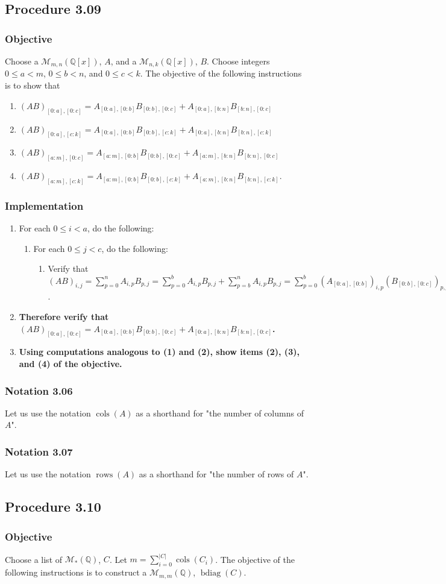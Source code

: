 \documentclass[twocolumn]{article}
\DeclareMathOperator{\bdiag}{bdiag}
\DeclareMathOperator{\cols}{cols}
\DeclareMathOperator{\rows}{rows}
\newcommand{\notation}[1]{\subsubsection*{Notation #1}}
\newcommand{\procedure}[2][]{\subsection*{Procedure #2 \ifthenelse{\equal{#1}{}}{}{(#1)}}\label{sec:procedure #2}}
\newcommand{\objective}{\subsubsection*{Objective}}
\newcommand{\implementation}{\subsubsection*{Implementation}}
\begin{document}
		\procedure{3.09}
			\objective
				Choose a $\mathcal{M}_{m,n}(\mathbb{Q}[x])$, $A$, and a $\mathcal{M}_{n,k}(\mathbb{Q}[x])$, $B$. Choose integers $0\le a<m$, $0\le b<n$, and $0\le c<k$. The objective of the following instructions is to show that
				\begin{enumerate}
					\item $(AB)_{[0:a],[0:c]}=A_{[0:a],[0:b]}B_{[0:b],[0:c]}+A_{[0:a],[b:n]}B_{[b:n],[0:c]}$
					\item $(AB)_{[0:a],[c:k]}=A_{[0:a],[0:b]}B_{[0:b],[c:k]}+A_{[0:a],[b:n]}B_{[b:n],[c:k]}$
					\item $(AB)_{[a:m],[0:c]}=A_{[a:m],[0:b]}B_{[0:b],[0:c]}+A_{[a:m],[b:n]}B_{[b:n],[0:c]}$
					\item $(AB)_{[a:m],[c:k]}=A_{[a:m],[0:b]}B_{[0:b],[c:k]}+A_{[a:m],[b:n]}B_{[b:n],[c:k]}$.
				\end{enumerate}
			\implementation
				\begin{enumerate}
					\item For each $0\le i<a$, do the following:
					\begin{enumerate}
						\item For each $0\le j<c$, do the following:
							\begin{enumerate}
								\item Verify that $(AB)_{i,j}=\sum_{p=0}^n A_{i,p}B_{p,j}=\sum_{p=0}^{b} A_{i,p}B_{p,j}+\sum_{p=b}^n A_{i,p}B_{p,j}=\sum_{p=0}^{b} (A_{[0:a],[0:b]})_{i,p}(B_{[0:b],[0:c]})_{p,j}+\sum_{p=0}^{n-b} (A_{[0:a],[b:n]})_{i,p}(B_{[b:n],[0:c]})_{p,j}=(A_{[0:a],[0:b]}B_{[0:b],[0:c]})_{i,j}+(A_{[0:a],[b:n]}B_{[b:n],[0:c]})_{i,j}$.
							\end{enumerate}
					\end{enumerate}
					\item \textbf{Therefore verify that $(AB)_{[0:a],[0:c]}=A_{[0:a],[0:b]}B_{[0:b],[0:c]}+A_{[0:a],[b:n]}B_{[b:n],[0:c]}$.}
					\item \textbf{Using computations analogous to (1) and (2), show items (2), (3), and (4) of the objective.}
				\end{enumerate}
		\notation{3.06}
			Let us use the notation $\cols(A)$ as a shorthand for "the number of columns of $A$".
		\notation{3.07}
			Let us use the notation $\rows(A)$ as a shorthand for "the number of rows of $A$".
		\procedure{3.10}
			\objective
				Choose a list of $\mathcal{M}_{*}(\mathbb{Q})$, $C$. Let $m=\sum_{i=0}^{\lvert C\rvert}\cols(C_i)$. The objective of the following instructions is to construct a $\mathcal{M}_{m,m}(\mathbb{Q})$, $\bdiag(C)$.
\end{document}
